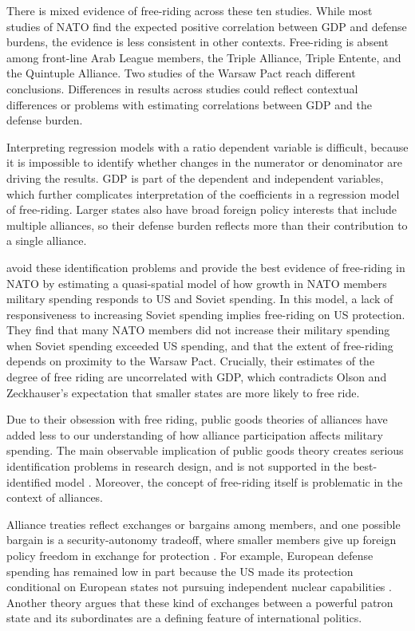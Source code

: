\documentclass[12pt]{article}
\begin{document}
There is mixed evidence of free-riding across these ten studies. 
While most studies of NATO find the expected positive correlation between GDP and defense burdens, the evidence is less consistent in other contexts. 
Free-riding is absent among front-line Arab League members, the Triple Alliance, Triple Entente, and the Quintuple Alliance. 
Two studies of the Warsaw Pact reach different conclusions. 
Differences in results across studies could reflect contextual differences or problems with estimating correlations between GDP and the defense burden. 


Interpreting regression models with a ratio dependent variable is difficult, because it is impossible to identify whether changes in the numerator or denominator are driving the results. 
GDP is part of the dependent and independent variables, which further complicates interpretation of the coefficients in a regression model of free-riding.
Larger states also have broad foreign policy interests that include multiple alliances, so their defense burden reflects more than their contribution to a single alliance.  


\citet{PluemperNeumayer2015} avoid these identification problems and provide the best evidence of free-riding in NATO by estimating a quasi-spatial model of how growth in NATO members military spending responds to US and Soviet spending. 
In this model, a lack of responsiveness to increasing Soviet spending implies free-riding on US protection. 
They find that many NATO members did not increase their military spending when Soviet spending exceeded US spending, and that the extent of free-riding depends on proximity to the Warsaw Pact.
Crucially, their estimates of the degree of free riding are uncorrelated with GDP, which contradicts Olson and Zeckhauser's expectation that smaller states are more likely to free ride. 


Due to their obsession with free riding, public goods theories of alliances have added less to our understanding of how alliance participation affects military spending. 
The main observable implication of public goods theory creates serious identification problems in research design, and is not supported in the best-identified model \citep{PluemperNeumayer2015}. 
Moreover, the concept of free-riding itself is problematic in the context of alliances. 


Alliance treaties reflect exchanges or bargains among members, and one possible bargain is a security-autonomy tradeoff, where smaller members give up foreign policy freedom in exchange for protection \citep{Morrow1991}. 
For example, European defense spending has remained low in part because the US made its protection conditional on European states not pursuing independent nuclear capabilities \citep{Lanoszka2015}. 
Another theory argues that these kind of exchanges between a powerful patron state and its subordinates are a defining feature of international politics. 
\end{document}
